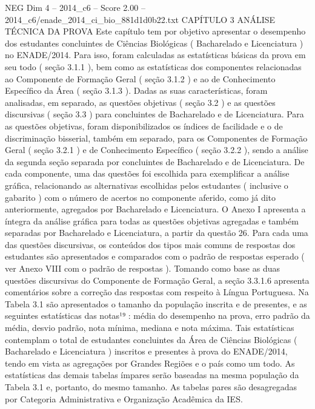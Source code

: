 \begin{textsample}{NEG Dim 4 – 2014\_c6 – Score 2.00 – 2014\_c6/enade\_2014\_ci\_bio\_881d1d0b22.txt}  \label{ex:f4_neg_281}
CAPÍTULO 3 ANÁLISE TÉCNICA DA PROVA Este capítulo tem por objetivo apresentar o desempenho dos estudantes concluintes de Ciências Biológicas ( Bacharelado e Licenciatura ) no ENADE/2014.
Para isso, foram calculadas as estatísticas básicas da prova em seu todo ( seção 3.1.1 ), bem como as estatísticas dos componentes relacionadas ao Componente de Formação Geral ( seção 3.1.2 ) e ao de Conhecimento Específico da Área ( seção 3.1.3 ).
Dadas as suas características, foram analisadas, em separado, as questões objetivas ( seção 3.2 ) e as questões discursivas ( seção 3.3 ) para concluintes de Bacharelado e de Licenciatura.
Para as questões objetivas, foram disponibilizados os índices de facilidade e o de discriminação bisserial, também em separado, para os Componentes de Formação Geral ( seção 3.2.1 ) e de Conhecimento Específico ( seção 3.2.2 ), sendo a análise da segunda seção separada por concluintes de Bacharelado e de Licenciatura.
De cada componente, uma das questões foi escolhida para exemplificar a análise gráfica, relacionando as alternativas escolhidas pelos estudantes ( inclusive o gabarito ) com o número de acertos no componente aferido, como já dito anteriormente, agregados por Bacharelado e Licenciatura.
O Anexo I apresenta a íntegra da análise gráfica para todas as questões objetivas agregadas e também separadas por Bacharelado e Licenciatura, a partir da questão 26.
Para cada uma das questões discursivas, os conteúdos dos tipos mais comuns de respostas dos estudantes são apresentados e comparados com o padrão de respostas esperado ( ver Anexo VIII com o padrão de respostas ).
Tomando como base as duas questões discursivas do Componente de Formação Geral, a seção 3.3.1.6 apresenta comentários sobre a correção das respostas com respeito à Língua Portuguesa.
Na Tabela 3.1 são apresentados o tamanho da população inscrita e de presentes, e as seguintes estatísticas das notas¹⁹ : média do desempenho na prova, erro padrão da média, desvio padrão, nota mínima, mediana e nota máxima.
Tais estatísticas contemplam o total de estudantes concluintes da Área de Ciências Biológicas ( Bacharelado e Licenciatura ) inscritos e presentes à prova do ENADE/2014, tendo em vista as agregações por Grandes Regiões e o país como um todo.
As estatísticas das demais tabelas ímpares serão baseadas na mesma população da Tabela 3.1 e, portanto, do mesmo tamanho.
As tabelas pares são desagregadas por Categoria Administrativa e Organização Acadêmica da IES.

\end{textsample}
